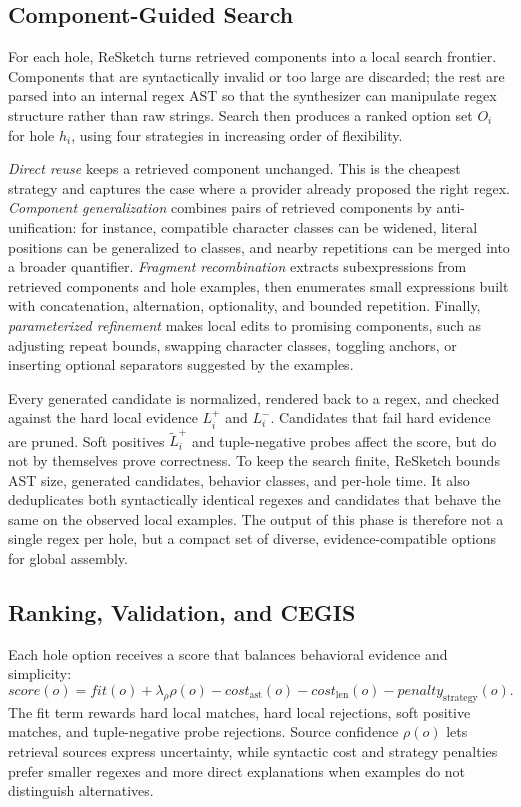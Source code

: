 \documentclass[sigconf,nonacm]{acmart}
\begin{document}
\subsection{Component-Guided Search}
For each hole, ReSketch turns retrieved components into a local search frontier.
Components that are syntactically invalid or too large are discarded; the rest
are parsed into an internal regex AST so that the synthesizer can manipulate
regex structure rather than raw strings. Search then produces a ranked option
set \(O_i\) for hole \(h_i\), using four strategies in increasing order of
flexibility.

\emph{Direct reuse} keeps a retrieved component unchanged. This is the cheapest
strategy and captures the case where a provider already proposed the right
regex. \emph{Component generalization} combines pairs of retrieved components by
anti-unification: for instance, compatible character classes can be widened,
literal positions can be generalized to classes, and nearby repetitions can be
merged into a broader quantifier. \emph{Fragment recombination} extracts
subexpressions from retrieved components and hole examples, then enumerates
small expressions built with concatenation, alternation, optionality, and
bounded repetition. Finally, \emph{parameterized refinement} makes local edits to
promising components, such as adjusting repeat bounds, swapping character
classes, toggling anchors, or inserting optional separators suggested by the
examples.

Every generated candidate is normalized, rendered back to a regex, and checked against the hard local evidence \(L_i^+\) and \(L_i^-\).
Candidates that fail hard evidence are pruned. Soft positives
\(\widetilde{L}_i^+\) and tuple-negative probes affect the score, but do not by
themselves prove correctness. To keep the search finite, ReSketch bounds AST
size, generated candidates, behavior classes, and per-hole time. It also
deduplicates both syntactically identical regexes and candidates that behave the
same on the observed local examples. The output of this phase is therefore not a
single regex per hole, but a compact set of diverse, evidence-compatible options
for global assembly.

\subsection{Ranking, Validation, and CEGIS}
Each hole option receives a score that balances behavioral evidence and
simplicity:
\[
  \mathit{score}(o)=
  \mathit{fit}(o)+\lambda_\rho\rho(o)
  -\mathit{cost}_{\mathrm{ast}}(o)-\mathit{cost}_{\mathrm{len}}(o)
  -\mathit{penalty}_{\mathrm{strategy}}(o).
\]
The fit term rewards hard local matches, hard local rejections, soft positive
matches, and tuple-negative probe rejections. Source confidence \(\rho(o)\)
lets retrieval sources express uncertainty, while syntactic cost and strategy
penalties prefer smaller regexes and more direct explanations when examples do
not distinguish alternatives.
\end{document}
